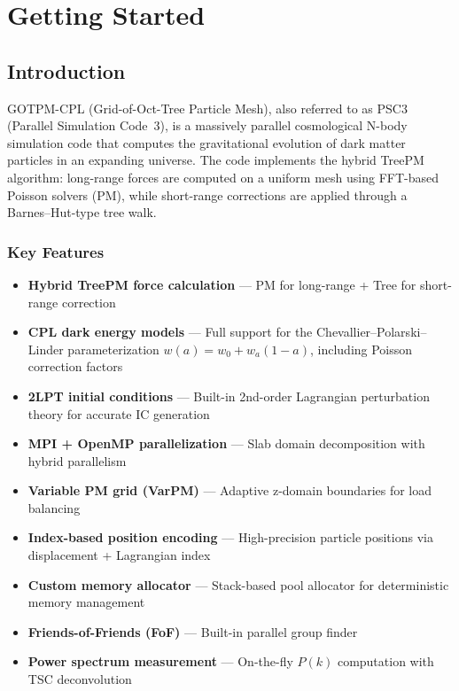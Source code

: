 \documentclass[11pt,fleqn]{book}
\begin{document}
\part{Getting Started}

\chapter{Introduction}
\label{ch:intro}

GOTPM-CPL (Grid-of-Oct-Tree Particle Mesh), also referred to as PSC3 (Parallel Simulation Code~3), is a massively parallel cosmological N-body simulation code that computes the gravitational evolution of dark matter particles in an expanding universe.  The code implements the hybrid TreePM algorithm: long-range forces are computed on a uniform mesh using FFT-based Poisson solvers (PM), while short-range corrections are applied through a Barnes--Hut-type tree walk.

\section{Key Features}

\begin{itemize}[leftmargin=2em]
  \item \textbf{Hybrid TreePM force calculation} --- PM for long-range + Tree for short-range correction
  \item \textbf{CPL dark energy models} --- Full support for the Chevallier--Polarski--Linder parameterization $w(a) = w_0 + w_a(1-a)$, including Poisson correction factors
  \item \textbf{2LPT initial conditions} --- Built-in 2nd-order Lagrangian perturbation theory for accurate IC generation
  \item \textbf{MPI + OpenMP parallelization} --- Slab domain decomposition with hybrid parallelism
  \item \textbf{Variable PM grid (VarPM)} --- Adaptive z-domain boundaries for load balancing
  \item \textbf{Index-based position encoding} --- High-precision particle positions via displacement + Lagrangian index
  \item \textbf{Custom memory allocator} --- Stack-based pool allocator for deterministic memory management
  \item \textbf{Friends-of-Friends (FoF)} --- Built-in parallel group finder
  \item \textbf{Power spectrum measurement} --- On-the-fly $P(k)$ computation with TSC deconvolution
\end{itemize}
\end{document}
